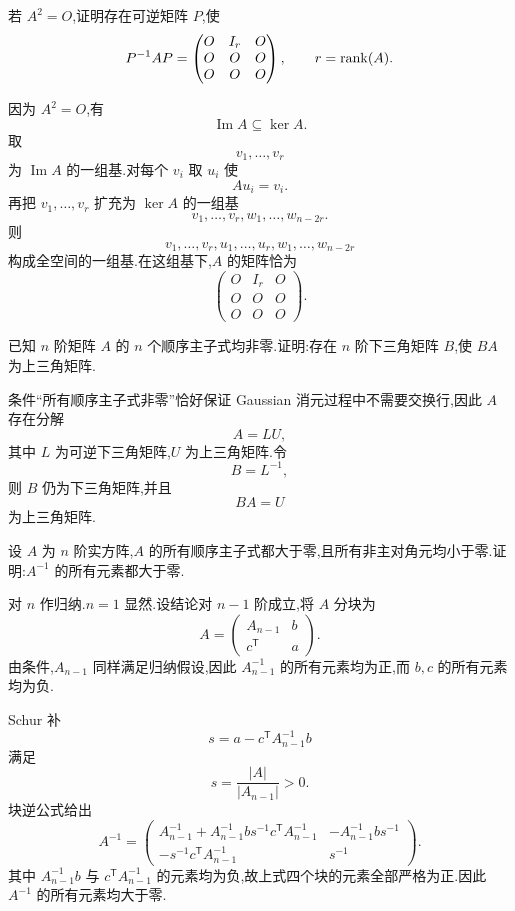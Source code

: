 \begin{example}
若 $A^2=O$,证明存在可逆矩阵 $P$,使
\[
P^{-1}AP
=
\begin{pmatrix}
O&I_r&O\\
O&O&O\\
O&O&O
\end{pmatrix},
\qquad r=\operatorname{rank}(A).
\]
\end{example}
\exampleblank

\begin{solution}
因为 $A^2=O$,有
\[
\operatorname{Im}A\subseteq\ker A.
\]
取
\[
v_1,\ldots,v_r
\]
为 $\operatorname{Im}A$ 的一组基.对每个 $v_i$ 取 $u_i$ 使
\[
Au_i=v_i.
\]
再把 $v_1,\ldots,v_r$ 扩充为 $\ker A$ 的一组基
\[
v_1,\ldots,v_r,w_1,\ldots,w_{n-2r}.
\]
则
\[
v_1,\ldots,v_r,u_1,\ldots,u_r,w_1,\ldots,w_{n-2r}
\]
构成全空间的一组基.在这组基下,$A$ 的矩阵恰为
\[
\boxed{
\begin{pmatrix}
O&I_r&O\\
O&O&O\\
O&O&O
\end{pmatrix}
}.
\]
\end{solution}

\begin{example}
已知 $n$ 阶矩阵 $A$ 的 $n$ 个顺序主子式均非零.证明:存在 $n$ 阶下三角矩阵 $B$,使 $BA$ 为上三角矩阵.
\end{example}
\exampleblank

\begin{solution}
条件``所有顺序主子式非零''恰好保证 Gaussian 消元过程中不需要交换行,因此 $A$ 存在分解
\[
A=LU,
\]
其中 $L$ 为可逆下三角矩阵,$U$ 为上三角矩阵.令
\[
B=L^{-1},
\]
则 $B$ 仍为下三角矩阵,并且
\[
\boxed{BA=U}
\]
为上三角矩阵.
\end{solution}

\begin{example}
设 $A$ 为 $n$ 阶实方阵,$A$ 的所有顺序主子式都大于零,且所有非主对角元均小于零.证明:$A^{-1}$ 的所有元素都大于零.
\end{example}
\exampleblank

\begin{solution}
对 $n$ 作归纳.$n=1$ 显然.设结论对 $n-1$ 阶成立,将 $A$ 分块为
\[
A=
\begin{pmatrix}
A_{n-1}&b\\
c^{\mathsf T}&a
\end{pmatrix}.
\]
由条件,$A_{n-1}$ 同样满足归纳假设,因此 $A_{n-1}^{-1}$ 的所有元素均为正,而 $b,c$ 的所有元素均为负.

Schur 补
\[
s=a-c^{\mathsf T}A_{n-1}^{-1}b
\]
满足
\[
s=\dfrac{|A|}{|A_{n-1}|}>0.
\]
块逆公式给出
\[
A^{-1}
=
\begin{pmatrix}
A_{n-1}^{-1}+A_{n-1}^{-1}bs^{-1}c^{\mathsf T}A_{n-1}^{-1}
&-A_{n-1}^{-1}bs^{-1}\\
-s^{-1}c^{\mathsf T}A_{n-1}^{-1}
&s^{-1}
\end{pmatrix}.
\]
其中 $A_{n-1}^{-1}b$ 与 $c^{\mathsf T}A_{n-1}^{-1}$ 的元素均为负,故上式四个块的元素全部严格为正.因此 $A^{-1}$ 的所有元素均大于零.
\end{solution}



